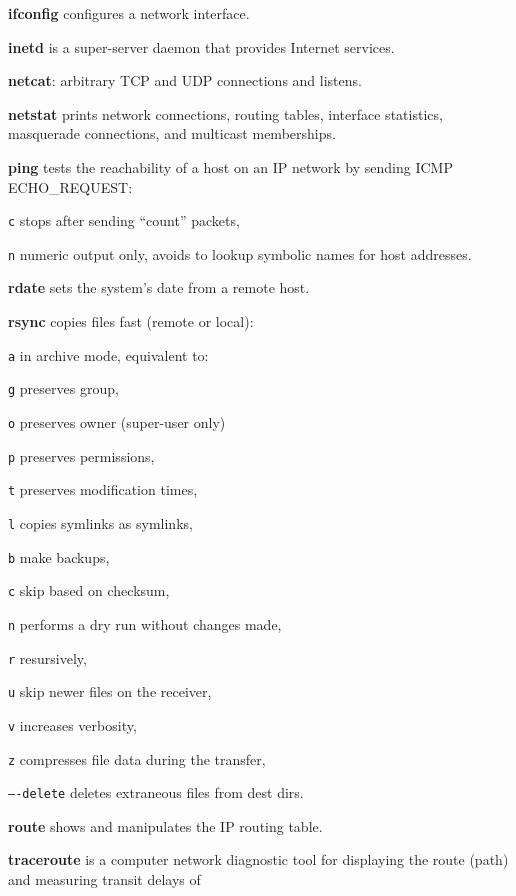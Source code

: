 \begin{compactenum}
\item [\cmdvar] \textbf{ifconfig} configures a network interface.   
\item [\cmdvar] \textbf{inetd} is a super-server daemon that provides Internet services.
\item [\cmdvar] \textbf{netcat}: arbitrary TCP and UDP connections and listens.
\item [\cmdvar] \textbf{netstat} prints network connections, routing tables, 
interface statistics, masquerade connections, and multicast memberships.
\item [\cmdvar] \textbf{ping} tests the reachability of a host 
on an IP network by sending ICMP ECHO\_REQUEST:
\item [\texttt{c}] stops after sending ``count'' packets,
\item [\texttt{n}] numeric output only, 
	avoids to lookup symbolic names for host addresses. 
\item [\cmdvar] \textbf{rdate} sets the system's date from a remote host.
\item [\cmdvar] \textbf{rsync} copies files fast (remote or local):
\item [\texttt{a}] in archive mode, equivalent to:
\item [\texttt{g}] preserves group,
\item [\texttt{o}] preserves owner (super-user only)
\item [\texttt{p}] preserves permissions,
\item [\texttt{t}] preserves modification times,
\item [\texttt{l}] copies symlinks as symlinks,
\item [\texttt{b}] make backups, 
\item [\texttt{c}] skip based on checksum, 
\item [\texttt{n}] performs a dry run without changes made, 
\item [\texttt{r}] resursively, 
\item [\texttt{u}] skip newer files on the receiver, 
\item [\texttt{v}] increases verbosity, 
\item [\texttt{z}] compresses file data during the transfer,
\item [\texttt{}] \texttt{----delete} deletes extraneous files from dest dirs.
\item [\cmdvar] \textbf{route} shows and manipulates the IP routing table.
\item [\cmdvar] \textbf{traceroute} is a computer network diagnostic tool for 
displaying the route (path) and measuring transit delays of 
\end{compactenum}
